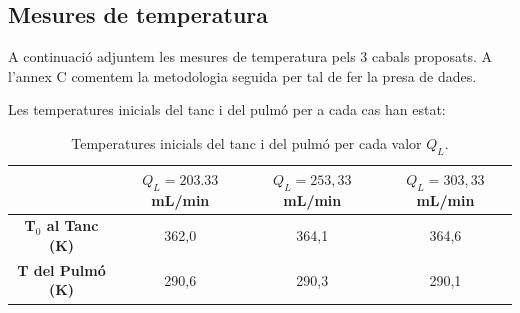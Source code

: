 \documentclass[10pt, twoside]{article}
\begin{document}
\subsection{Mesures de temperatura}
A continuació adjuntem les mesures de temperatura pels 3 cabals proposats. A l'annex C comentem la metodologia seguida per tal de fer la presa de dades.

Les temperatures inicials del tanc i del pulmó per a cada cas han estat:

\begin{table}[h!]
    \centering
    \caption{Temperatures inicials del tanc i del pulmó per cada valor $Q_L$.}
    \begin{tabular}{cccc}
        \toprule
        & $Q_L = 203.33$ mL/min & $Q_L = 253,33$ mL/min & $Q_L = 303,33$ mL/min \\
        \midrule
        \textbf{T$_0$ al Tanc (K)} & 362,0 & 364,1 & 364,6 \\
        \textbf{T del Pulmó (K)}  & 290,6 & 290,3 & 290,1 \\
        \bottomrule
    \end{tabular}
    \label{tabla:temperaturas}
\end{table}
\end{document}
